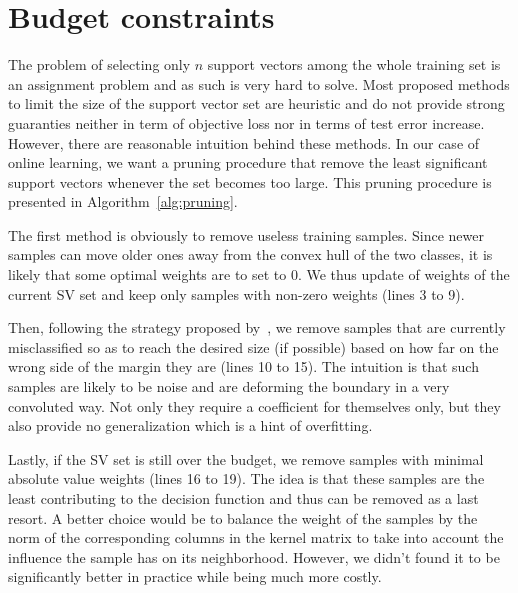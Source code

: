 \documentclass[10pt,final,a4paper]{article}
\begin{document}
\section{Budget constraints}
\label{sec:budget}

The problem of selecting only $n$ support vectors among the whole training set is an assignment problem and as such is very hard to solve.
Most proposed methods to limit the size of the support vector set are heuristic and do not provide strong guaranties neither in term of objective loss nor in terms of test error increase.
However, there are reasonable intuition behind these methods.
In our case of online learning, we want a pruning procedure that remove the least significant support vectors whenever the set becomes too large.
This pruning procedure is presented in Algorithm~\ref{alg:pruning}.

The first method is obviously to remove useless training samples.
Since newer samples can move older ones away from the convex hull of the two classes, it is likely that some optimal weights are to set to 0.
We thus update of weights of the current SV set and keep only samples with non-zero weights (lines 3 to 9).

Then, following the strategy proposed by~\cite{geebelen12tnnls}, we remove samples that are currently misclassified so as to reach the desired size (if possible) based on how far on the wrong side of the margin they are (lines 10 to 15).
The intuition is that such samples are likely to be noise and are deforming the boundary in a very convoluted way.
Not only they require a coefficient for themselves only, but they also provide no generalization which is a hint of overfitting.

Lastly, if the SV set is still over the budget, we remove samples with minimal absolute value weights (lines 16 to 19).
The idea is that these samples are the least contributing to the decision function and thus can be removed as a last resort.
A better choice would be to balance the weight of the samples by the norm of the corresponding columns in the kernel matrix to take into account the influence the sample has on its neighborhood.
However, we didn't found it to be significantly better in practice while being much more costly.
\end{document}
